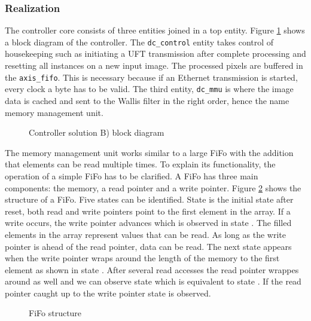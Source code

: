 \subsubsection*{Realization}
The controller core consists of three entities joined in a top entity. Figure 
\ref{fig:dctop} shows a block diagram of the controller. The 
\texttt{dc\_control} entity takes control of housekeeping such as initiating a
UFT transmission after complete processing and resetting all instances on a new
input image. The processed pixels are buffered in the \texttt{axis\_fifo}. This
is necessary because if an Ethernet transmission is started, every clock a byte
has to be valid. The third entity, \texttt{dc\_mmu} is where the image data is
cached and sent to the Wallis filter in the right order, hence the name memory
management unit.

\begin{figure}[b!]
    \centering
    \begin{adjustbox}{max width=1\textwidth}
        
    \end{adjustbox}
    \caption{Controller solution B) block diagram}
    \label{fig:dctop}
\end{figure}

The memory management unit works similar to a large FiFo with the addition that
elements can be read multiple times. To explain its functionality, the operation
of a simple FiFo has to be clarified. A FiFo has three main components: the
memory, a read pointer and a write pointer. Figure \ref{fig:fifo} shows the
structure of a FiFo. Five states can be identified. State  is the initial
state after reset, both read and write pointers point to the first element in
the array. If a write occurs, the write pointer advances which is observed in
state . The filled elements in the array represent values that can be
read. As long as the write pointer is ahead of the read pointer, data can be
read. The next state appears when the write pointer wraps around the length of
the memory to the first element as shown in state . After several read
accesses the read pointer wrappes around as well and we can observe state 
 which is equivalent to state . If the read pointer caught up to
the write pointer state  is observed.

\begin{figure}[tb!]
    \centering
    \begin{adjustbox}{max width=\textwidth}
        
    \end{adjustbox}
    \caption{FiFo structure}
    \label{fig:fifo}
\end{figure}

